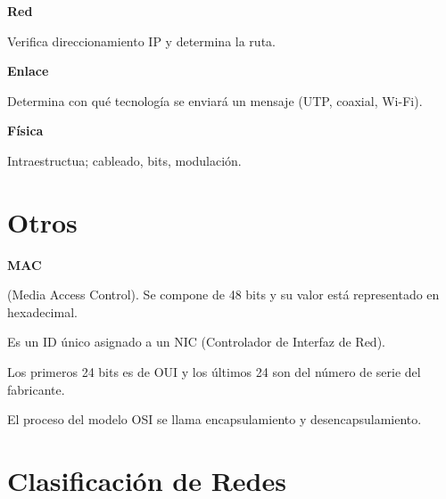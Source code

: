 \documentclass{article}
\begin{document}
\textbf{Red}
\vspace{1em}

Verifica direccionamiento IP y determina la ruta.

\textbf{Enlace}
\vspace{1em}

Determina con qué tecnología se enviará un mensaje (UTP, coaxial, Wi-Fi).
\vspace{1em}

\textbf{Física}
\vspace{1em}

Intraestructua; cableado, bits, modulación.
\vspace{1em}

\section{Otros}

\textbf{MAC}
\vspace{1em}

(Media Access Control). Se compone de 48 bits y su valor está representado en
hexadecimal.

Es un ID único asignado a un NIC (Controlador de Interfaz de Red).

Los primeros 24 bits es de OUI y los últimos 24 son del número de serie del
fabricante.

El proceso del modelo OSI se llama encapsulamiento y desencapsulamiento.

\section{Clasificación de Redes}
\end{document}
